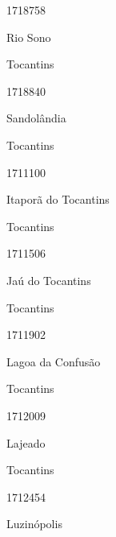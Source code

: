 \documentclass[
  letterpaper,
]{report}
\begin{document}
1718758

\n      

Rio Sono

\n    

\n    

\n      

Tocantins

\n      

1718840

\n      

Sandolândia

\n    

\n    

\n      

Tocantins

\n      

1711100

\n      

Itaporã do Tocantins

\n    

\n    

\n      

Tocantins

\n      

1711506

\n      

Jaú do Tocantins

\n    

\n    

\n      

Tocantins

\n      

1711902

\n      

Lagoa da Confusão

\n    

\n    

\n      

Tocantins

\n      

1712009

\n      

Lajeado

\n    

\n    

\n      

Tocantins

\n      

1712454

\n      

Luzinópolis

\n    
\end{document}
